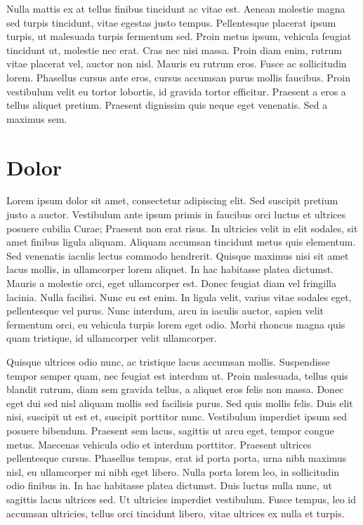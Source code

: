 Nulla mattis ex at tellus finibus tincidunt ac vitae est. Aenean molestie magna sed turpis tincidunt, vitae egestas justo tempus. Pellentesque placerat ipsum turpis, ut malesuada turpis fermentum sed. Proin metus ipsum, vehicula feugiat tincidunt ut, molestie nec erat. Cras nec nisi massa. Proin diam enim, rutrum vitae placerat vel, auctor non nisl. Mauris eu rutrum eros. Fusce ac sollicitudin lorem. Phasellus cursus ante eros, cursus accumsan purus mollis faucibus. Proin vestibulum velit eu tortor lobortis, id gravida tortor efficitur. Praesent a eros a tellus aliquet pretium. Praesent dignissim quis neque eget venenatis. Sed a maximus sem.

\section{Dolor}

Lorem ipsum dolor sit amet, consectetur adipiscing elit. Sed suscipit pretium justo a auctor. Vestibulum ante ipsum primis in faucibus orci luctus et ultrices posuere cubilia Curae; Praesent non erat risus. In ultricies velit in elit sodales, sit amet finibus ligula aliquam. Aliquam accumsan tincidunt metus quis elementum. Sed venenatis iaculis lectus commodo hendrerit. Quisque maximus nisi sit amet lacus mollis, in ullamcorper lorem aliquet. In hac habitasse platea dictumst. Mauris a molestie orci, eget ullamcorper est. Donec feugiat diam vel fringilla lacinia. Nulla facilisi. Nunc eu est enim. In ligula velit, varius vitae sodales eget, pellentesque vel purus. Nunc interdum, arcu in iaculis auctor, sapien velit fermentum orci, eu vehicula turpis lorem eget odio. Morbi rhoncus magna quis quam tristique, id ullamcorper velit ullamcorper.

Quisque ultrices odio nunc, ac tristique lacus accumsan mollis. Suspendisse tempor semper quam, nec feugiat est interdum ut. Proin malesuada, tellus quis blandit rutrum, diam sem gravida tellus, a aliquet eros felis non massa. Donec eget dui sed nisl aliquam mollis sed facilisis purus. Sed quis mollis felis. Duis elit nisi, suscipit ut est et, suscipit porttitor nunc. Vestibulum imperdiet ipsum sed posuere bibendum. Praesent sem lacus, sagittis ut arcu eget, tempor congue metus. Maecenas vehicula odio et interdum porttitor. Praesent ultrices pellentesque cursus. Phasellus tempus, erat id porta porta, urna nibh maximus nisl, eu ullamcorper mi nibh eget libero. Nulla porta lorem leo, in sollicitudin odio finibus in. In hac habitasse platea dictumst. Duis luctus nulla nunc, ut sagittis lacus ultrices sed. Ut ultricies imperdiet vestibulum. Fusce tempus, leo id accumsan ultricies, tellus orci tincidunt libero, vitae ultrices ex nulla et turpis.

